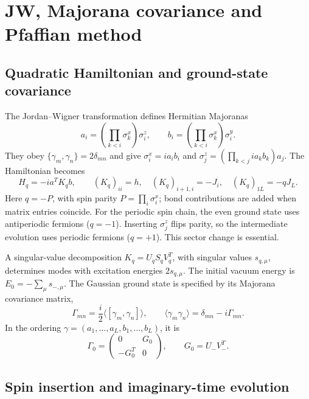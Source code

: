 \documentclass[a4paper,11pt]{article}
\begin{document}
\appendix
\section{JW, Majorana covariance and Pfaffian method}
\subsection{Quadratic Hamiltonian and ground-state covariance}

The Jordan--Wigner transformation defines Hermitian Majoranas
\begin{equation}
 a_i=\left(\prod_{k<i}\sigma_k^x\right)\sigma_i^z,
 \qquad b_i=\left(\prod_{k<i}\sigma_k^x\right)\sigma_i^y.
\end{equation}
They obey $\{\gamma_m,\gamma_n\}=2\delta_{mn}$ and give
$\sigma_i^x=i a_i b_i$ and
$\sigma_j^z=(\prod_{k<j}i a_k b_k)a_j$. The Hamiltonian becomes
\begin{equation}
 H_q=-i a^TK_qb,\qquad
 (K_q)_{ii}=h,\quad (K_q)_{i+1,i}=-J_i,\quad
 (K_q)_{1L}=-qJ_L.
\end{equation}
Here $q=-P$, with spin parity $P=\prod_i\sigma_i^x$; bond contributions
are added when matrix entries coincide. For the periodic spin chain, the even ground
state uses antiperiodic fermions ($q=-1$). Inserting $\sigma_j^z$ flips
parity, so the intermediate evolution uses periodic fermions ($q=+1$).
This sector change is essential.

A singular-value decomposition $K_q=U_qS_qV_q^T$, with singular values
$s_{q,\mu}$, determines modes with excitation energies $2s_{q,\mu}$.
The initial vacuum energy is $E_0=-\sum_\mu s_{-,\mu}$.
The Gaussian ground
state is specified by its Majorana covariance matrix,
\begin{equation}
 \Gamma_{mn}=\frac{i}{2}\langle[\gamma_m,\gamma_n]\rangle,
 \qquad \langle\gamma_m\gamma_n\rangle=\delta_{mn}-i\Gamma_{mn}.
\end{equation}
In the ordering $\gamma=(a_1,\ldots,a_L,b_1,\ldots,b_L)$, it is
\begin{equation}
 \Gamma_0=\begin{pmatrix}0&G_0\\-G_0^T&0\end{pmatrix},
 \qquad G_0=U_-V_-^T.
\end{equation}

\subsection{Spin insertion and imaginary-time evolution}
\end{document}
